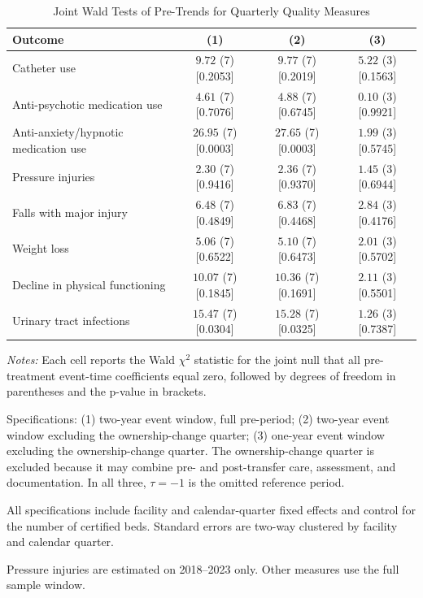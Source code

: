 \begin{table}[!ht]
\centering
\begin{threeparttable}
\caption{Joint Wald Tests of Pre-Trends for Quarterly Quality Measures}
\label{tab:wald-test-quality}
\small
\setlength{\tabcolsep}{5pt}

\begin{tabular}{@{}lccc@{}}
\toprule
Outcome & (1) & (2) & (3) \\
\midrule
Catheter use & $9.72$ (7) [0.2053] & $9.77$ (7) [0.2019] & $5.22$ (3) [0.1563] \\
Anti-psychotic medication use & $4.61$ (7) [0.7076] & $4.88$ (7) [0.6745] & $0.10$ (3) [0.9921] \\
Anti-anxiety/hypnotic medication use & $26.95$ (7) [0.0003] & $27.65$ (7) [0.0003] & $1.99$ (3) [0.5745] \\
Pressure injuries & $2.30$ (7) [0.9416] & $2.36$ (7) [0.9370] & $1.45$ (3) [0.6944] \\
Falls with major injury & $6.48$ (7) [0.4849] & $6.83$ (7) [0.4468] & $2.84$ (3) [0.4176] \\
Weight loss & $5.06$ (7) [0.6522] & $5.10$ (7) [0.6473] & $2.01$ (3) [0.5702] \\
Decline in physical functioning & $10.07$ (7) [0.1845] & $10.36$ (7) [0.1691] & $2.11$ (3) [0.5501] \\
Urinary tract infections & $15.47$ (7) [0.0304] & $15.28$ (7) [0.0325] & $1.26$ (3) [0.7387] \\
\bottomrule
\end{tabular}

\begin{tablenotes}[flushleft]
\footnotesize
\item \textit{Notes:} Each cell reports the Wald $\chi^2$ statistic for the joint null that all pre-treatment event-time coefficients equal zero, followed by degrees of freedom in parentheses and the p-value in brackets.
\item Specifications: (1) two-year event window, full pre-period; (2) two-year event window excluding the ownership-change quarter; (3) one-year event window excluding the ownership-change quarter. The ownership-change quarter is excluded because it may combine pre- and post-transfer care, assessment, and documentation. In all three, $\tau=-1$ is the omitted reference period.
\item All specifications include facility and calendar-quarter fixed effects and control for the number of certified beds. Standard errors are two-way clustered by facility and calendar quarter.
\item Pressure injuries are estimated on 2018--2023 only. Other measures use the full sample window.
\end{tablenotes}
\end{threeparttable}
\end{table}

